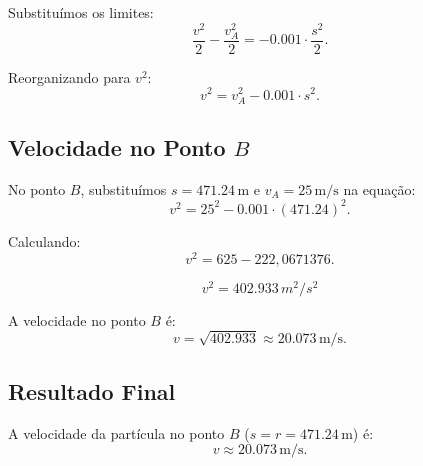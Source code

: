 Substituímos os limites:
\[
\frac{v^2}{2} - \frac{v_A^2}{2} = -0.001 \cdot \frac{s^2}{2}.
\]

Reorganizando para \(v^2\):
\[
v^2 = v_A^2 - 0.001 \cdot s^2.
\]

\subsection*{Velocidade no Ponto \(B\)}
No ponto \(B\), substituímos \(s = 471.24 \, \text{m}\) e \(v_A = 25 \, \text{m/s}\) na equação:
\[
v^2 = 25^2 - 0.001 \cdot (471.24)^2.
\]

Calculando:
\[
v^2 = 625 - 222,0671376.
\]

\[
v^2 = 402.933 \, m^2/s^2
\]

A velocidade no ponto \(B\) é:
\[
v = \sqrt{402.933} \approx 20.073 \, \text{m/s}.
\]

\subsection*{Resultado Final}
A velocidade da partícula no ponto \(B\) (\(s = r = 471.24 \, \text{m}\)) é:
\[
v \approx 20.073 \, \text{m/s}.
\]
